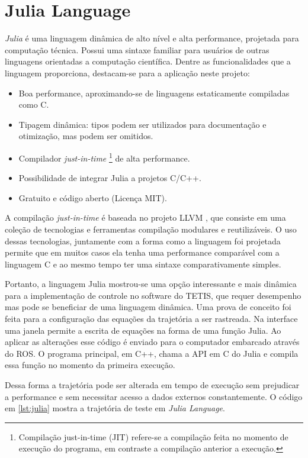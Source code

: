 \section{Julia Language}

\textit{Julia} é uma linguagem dinâmica de alto nível e alta performance, projetada para computação técnica. Possui uma sintaxe familiar para usuários de outras linguagens orientadas a computação científica. Dentre as funcionalidades que a linguagem proporciona, destacam-se para a aplicação neste projeto:

\begin{itemize}
\item Boa performance, aproximando-se de linguagens estaticamente compiladas como C.
\item Tipagem dinâmica: tipos podem ser utilizados para documentação e otimização, mas podem ser omitidos.
\item Compilador \textit{just-in-time} \footnote{Compilação just-in-time (JIT) refere-se a compilação feita no momento de execução do programa, em contraste a compilação anterior a execução.} de alta performance.
\item Possibilidade de integrar Julia a projetos C/C++.
\item Gratuito e código aberto (Licença MIT).
\end{itemize}

A compilação \textit{just-in-time} é baseada no projeto LLVM \citep{llvmorg,lattner2004llvm}, que consiste em uma coleção de tecnologias e ferramentas compilação modulares e reutilizáveis. O uso dessas tecnologias, juntamente com a forma como a linguagem foi projetada permite que em muitos casos ela tenha uma performance comparável com a linguagem C e ao mesmo tempo ter uma sintaxe comparativamente simples.

Portanto, a linguagem Julia mostrou-se uma opção interessante e mais dinâmica para a implementação de controle no software do TETIS, que requer desempenho mas pode se beneficiar de uma linguagem dinâmica. Uma prova de conceito foi feita para a configuração das equações da trajetória a ser rastreada. Na interface uma janela permite a escrita de equações na forma de uma função Julia. Ao aplicar as alterações esse código é enviado para o computador embarcado através do ROS. O programa principal, em C++, chama a API em C do Julia e compila essa função no momento da primeira execução.

Dessa forma a trajetória pode ser alterada em tempo de execução sem prejudicar a performance e sem necessitar acesso a dados externos constantemente. O código em \ref{lst:julia} mostra a trajetória de teste em \textit{Julia Language}.

